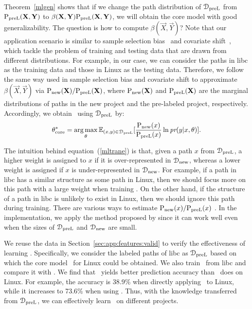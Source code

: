 \documentclass[12pt]{report}	%
\begin{document}
Theorem~\ref{mlgen} shows that if we change the path distribution of $\mathcal{D}_\text{preL}$
from $\text{P}_\text{preL} (\mathbf{X}, \mathbf{Y})$ to $\beta(\mathbf{X}, \mathbf{Y}) \text{P}_\text{preL} (\mathbf{X}, \mathbf{Y})$,
we will obtain the core model with good generalizability.
%
The question is how to compute $\beta(\vec{X}, \vec{Y})$?
%
Note that our application scenario is similar to sample selection bias~\cite{zadrozny2004learning} 
and covariate shift~\cite{shimodaira2000improving},
which tackle the problem of training and testing data that are drawn from different distributions.
For example, in our case, we can consider the paths in libc as the training data
and those in Linux as the testing data.
%
Therefore, we follow the same way used in sample selection bias and covariate shift
to approximate $\beta(\vec{X}, \vec{Y})$ via $\text{P}_\text{new} (\mathbf{X}) / \text{P}_\text{preL} (\mathbf{X})$,
where $\text{P}_\text{new} (\mathbf{X})$ and $\text{P}_\text{preL} (\mathbf{X})$ are the marginal distributions of paths 
in the new project and the pre-labeled project, respectively.
Accordingly, we obtain \cm\ using $\mathcal{D}_\text{preL}$ by:
%
\begin{equation} \label{mltrane}
\theta_\text{core}^* 
= \operatorname*{arg\,max}_{\theta} \mathbb{E}_{(x, y) \in \mathcal{D}_\text{preL}}[\frac{\text{P}_\text{new} (x)}{\text{P}_\text{preL} (x)} \ln \textit{pr} (y | x, \theta)].
\end{equation}

The intuition behind equation~(\ref{mltrane}) is that,
given a path $x$ from $\mathcal{D}_\text{preL}$,
a higher weight is assigned to $x$ if it is over-represented in $\mathcal{D}_\text{new}$,
whereas a lower weight is assigned if $x$ is under-represented in $\mathcal{D}_\text{new}$.
%
For example, 
if a path in libc has a similar structure as some path in Linux,
then we should focus more on this path with a large weight when training \cm.
On the other hand, if the structure of a path in libc is unlikely to exist in Linux,
then we should ignore this path during training.
%
There are various ways to estimate $\text{P}_\text{new} (x) / \text{P}_\text{preL} (x)$
\cite{zadrozny2004learning,huang2007correcting,sugiyama2008direct}.
In the implementation, we apply the method proposed by \cite{huang2007correcting}
since it can work well even when the sizes of $\mathcal{D}_\text{preL}$ and $\mathcal{D}_\text{new}$ are small.


We reuse the data in Section~\ref{sec:app:features:valid} 
to verify the effectiveness of learning \cm.
Specifically, we consider the labeled paths of libc as $\mathcal{D}_\text{preL}$
based on which the core model \cm\ for Linux could be obtained.
We also train \sm\ from libc and compare it with \cm.
We find that
\cm\ yields better prediction accuracy than \sm\ does on Linux.
%
For example, the accuracy is 38.9\% when directly applying \sm\ to Linux,
while it increases to 73.6\% when using \cm.
%
Thus, with the knowledge transferred from $\mathcal{D}_\text{preL}$,
we can effectively learn \cm\ on different projects.
\end{document}
